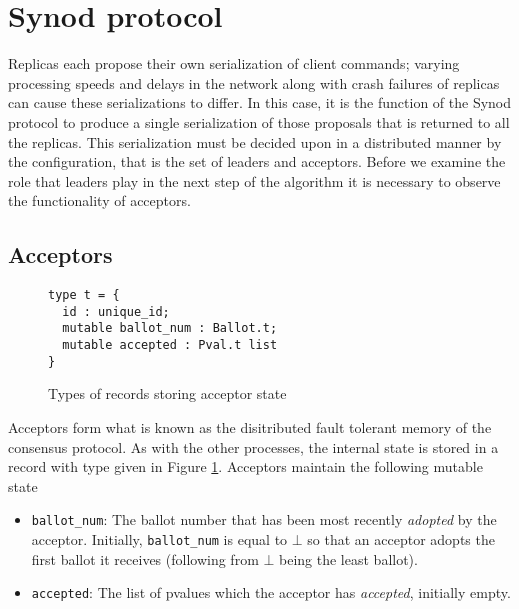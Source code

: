 
\section{Synod protocol}

Replicas each propose their own serialization of client commands; varying processing speeds and delays in the network along with crash failures of replicas can cause these serializations to differ. In this case, it is the function of the Synod protocol to produce a single serialization of those proposals that is returned to all the replicas. This serialization must be decided upon in a distributed manner by the configuration, that is the set of leaders and acceptors. Before we examine the role that leaders play in the next step of the algorithm it is necessary to observe the functionality of acceptors.

\subsection{Acceptors}

\begin{figure}
  \begin{lstlisting}
type t = {
  id : unique_id;
  mutable ballot_num : Ballot.t;
  mutable accepted : Pval.t list
}
\end{lstlisting}
  \centering
  \caption{Types of records storing acceptor state}
  \label{fig:acceptor-type}
\end{figure}

Acceptors form what is known as the disitributed fault tolerant memory of the consensus protocol. As with the other processes, the internal state is stored in a record with type given in Figure \ref{fig:acceptor-type}. Acceptors maintain the following mutable state

\begin{itemize}
  \item \texttt{ballot\_num}: The ballot number that has been most recently \emph{adopted} by the acceptor. Initially, \texttt{ballot\_num} is equal to $\bot$ so that an acceptor adopts the first ballot it receives (following from $\bot$ being the least ballot).
  \item \texttt{accepted}: The list of pvalues which the acceptor has \emph{accepted}, initially empty.
\end{itemize}

